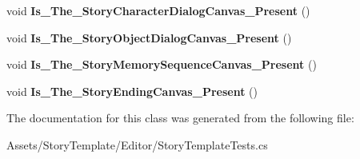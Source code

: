 \begin{DoxyCompactItemize}
\item 
void {\bfseries Is\+\_\+\+The\+\_\+\+Story\+Character\+Dialog\+Canvas\+\_\+\+Present} ()\hypertarget{classAssets_1_1StoryTemplate_1_1Editor_1_1StoryTemplateTests_1_1Canvases_a28c2bbea7cb1b6aa7afefd77549e60b9}{}\label{classAssets_1_1StoryTemplate_1_1Editor_1_1StoryTemplateTests_1_1Canvases_a28c2bbea7cb1b6aa7afefd77549e60b9}

\item 
void {\bfseries Is\+\_\+\+The\+\_\+\+Story\+Object\+Dialog\+Canvas\+\_\+\+Present} ()\hypertarget{classAssets_1_1StoryTemplate_1_1Editor_1_1StoryTemplateTests_1_1Canvases_a19e9358e545244241c0edc5e9edc23d5}{}\label{classAssets_1_1StoryTemplate_1_1Editor_1_1StoryTemplateTests_1_1Canvases_a19e9358e545244241c0edc5e9edc23d5}

\item 
void {\bfseries Is\+\_\+\+The\+\_\+\+Story\+Memory\+Sequence\+Canvas\+\_\+\+Present} ()\hypertarget{classAssets_1_1StoryTemplate_1_1Editor_1_1StoryTemplateTests_1_1Canvases_a91513a5e02317afbed233bafa5ea3d82}{}\label{classAssets_1_1StoryTemplate_1_1Editor_1_1StoryTemplateTests_1_1Canvases_a91513a5e02317afbed233bafa5ea3d82}

\item 
void {\bfseries Is\+\_\+\+The\+\_\+\+Story\+Ending\+Canvas\+\_\+\+Present} ()\hypertarget{classAssets_1_1StoryTemplate_1_1Editor_1_1StoryTemplateTests_1_1Canvases_a8c58e3de320be0c1e7716d75a21f5561}{}\label{classAssets_1_1StoryTemplate_1_1Editor_1_1StoryTemplateTests_1_1Canvases_a8c58e3de320be0c1e7716d75a21f5561}

\end{DoxyCompactItemize}


The documentation for this class was generated from the following file\+:\begin{DoxyCompactItemize}
\item 
Assets/\+Story\+Template/\+Editor/Story\+Template\+Tests.\+cs\end{DoxyCompactItemize}
